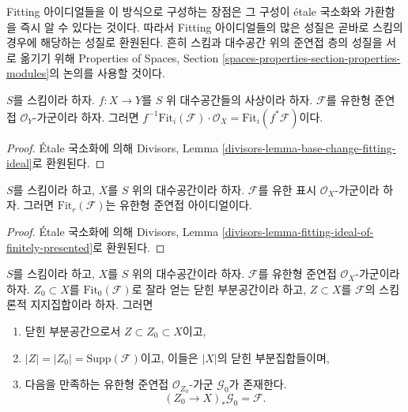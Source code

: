 \medskip\noindent
Fitting 아이디얼들을 이 방식으로 구성하는 장점은 그 구성이 \'etale
국소화와 가환함을 즉시 알 수 있다는 것이다. 따라서 Fitting 아이디얼들의
많은 성질은 곧바로 스킴의 경우에 해당하는 성질로 환원된다. 흔히 스킴과
대수공간 위의 준연접 층의 성질을 서로 옮기기 위해 Properties of Spaces,
Section \ref{spaces-properties-section-properties-modules}의 논의를 사용할 것이다.

\begin{lemma}
\label{lemma-base-change-fitting-ideal}
$S$를 스킴이라 하자. $f : X \to Y$를 $S$ 위 대수공간들의 사상이라 하자.
$\mathcal{F}$를 유한형 준연접 $\mathcal{O}_Y$-가군이라 하자. 그러면
$f^{-1}\text{Fit}_i(\mathcal{F}) \cdot \mathcal{O}_X =
\text{Fit}_i(f^*\mathcal{F})$이다.
\end{lemma}

\begin{proof}
\'Etale 국소화에 의해 Divisors, Lemma
\ref{divisors-lemma-base-change-fitting-ideal}로 환원된다.
\end{proof}

\begin{lemma}
\label{lemma-fitting-ideal-of-finitely-presented}
$S$를 스킴이라 하고, $X$를 $S$ 위의 대수공간이라 하자.
$\mathcal{F}$를 유한 표시 $\mathcal{O}_X$-가군이라 하자. 그러면
$\text{Fit}_r(\mathcal{F})$는 유한형 준연접 아이디얼이다.
\end{lemma}

\begin{proof}
\'Etale 국소화에 의해 Divisors, Lemma
\ref{divisors-lemma-fitting-ideal-of-finitely-presented}로 환원된다.
\end{proof}

\begin{lemma}
\label{lemma-on-subscheme-cut-out-by-Fit-0}
$S$를 스킴이라 하고, $X$를 $S$ 위의 대수공간이라 하자.
$\mathcal{F}$를 유한형 준연접 $\mathcal{O}_X$-가군이라 하자.
$Z_0 \subset X$를 $\text{Fit}_0(\mathcal{F})$로 잘라 얻는 닫힌 부분공간이라
하고, $Z \subset X$를 $\mathcal{F}$의 스킴론적 지지집합이라 하자. 그러면
\begin{enumerate}
\item 닫힌 부분공간으로서 $Z \subset Z_0 \subset X$이고,
\item $|Z| = |Z_0| = \text{Supp}(\mathcal{F})$이고, 이들은 $|X|$의
닫힌 부분집합들이며,
\item 다음을 만족하는 유한형 준연접 $\mathcal{O}_{Z_0}$-가군
$\mathcal{G}_0$가 존재한다.
$$
(Z_0 \to X)_*\mathcal{G}_0 = \mathcal{F}.
$$
\end{enumerate}
\end{lemma}

